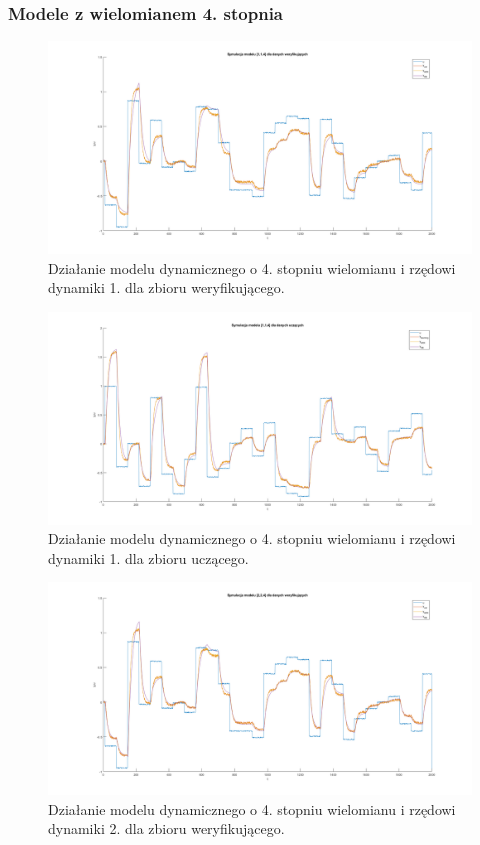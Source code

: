 \subsubsection{Modele z wielomianem 4. stopnia}
\begin{figure}[H]
\centering
\includegraphics[width=16cm,trim={5cm 1cm 5cm 1cm},clip]{images/d19.png}
\caption{Działanie modelu dynamicznego o 4. stopniu wielomianu i rzędowi dynamiki 1. dla zbioru weryfikującego.}
\label{fig:d19}
\end{figure}
\begin{figure}[H]
\centering
\includegraphics[width=16cm,trim={5cm 1cm 5cm 1cm},clip]{images/d20.png}
\caption{Działanie modelu dynamicznego o 4. stopniu wielomianu i rzędowi dynamiki 1. dla zbioru uczącego.}
\label{fig:d20}
\end{figure}
\begin{figure}[H]
\centering
\includegraphics[width=16cm,trim={5cm 1cm 5cm 1cm},clip]{images/d21.png}
\caption{Działanie modelu dynamicznego o 4. stopniu wielomianu i rzędowi dynamiki 2. dla zbioru weryfikującego.}
\label{fig:d21}
\end{figure}
